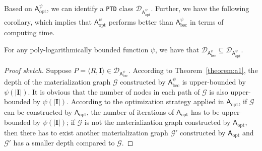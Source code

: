 Based on $\mathsf{A}_{\text{opt}}^{\psi}$, we can identify a \texttt{PTD} class $\mathcal{D}_{\mathsf{A}_{\text{opt}}^{\psi}}$.
Further, we have the following corollary, which implies that $\mathsf{A}_{\text{opt}}^{\psi}$ performs better
than $\mathsf{A}_{\text{bsc}}^{\psi}$ in terms of computing time.

\begin{corollary}
For any poly-logarithmically bounded function $\psi$,
we have that $\mathcal{D}_{\mathsf{A}_{\text{bsc}}^{\psi}}\subseteq\mathcal{D}_{\mathsf{A}_{\text{opt}}^{\psi}}$.
\end{corollary}

\begin{proof}[Proof sketch]
Suppose $P=\langle R,\textbf{I}\rangle\in\mathcal{D}_{\mathsf{A}_{\text{bsc}}^{\psi}}$. According to Theorem~\ref{theorem:a1},
the depth of the materialization graph $\mathcal{G}$ constructed by $\mathsf{A}_{\text{bsc}}^{\psi}$ is
upper-bounded by $\psi(|\textbf{I}|)$.
It is obvious that the number of nodes in each path of $\mathcal{G}$ is also upper-bounded by $\psi(|\textbf{I}|)$.
According to the optimization strategy applied in $\mathsf{A}_{\text{opt}}$, if $\mathcal{G}$ can be constructed
by $\mathsf{A}_{\text{opt}}$, the number of iterations of $\mathsf{A}_{\text{opt}}$ has to be upper-bounded by $\psi(|\textbf{I}|)$;
if $\mathcal{G}$ is not the materialization graph constructed
by $\mathsf{A}_{\text{opt}}$, then there has to exist another materialization graph $\mathcal{G}'$ constructed by $\mathsf{A}_{\text{opt}}$
and $\mathcal{G}'$ has a smaller depth compared to $\mathcal{G}$.
\end{proof}



